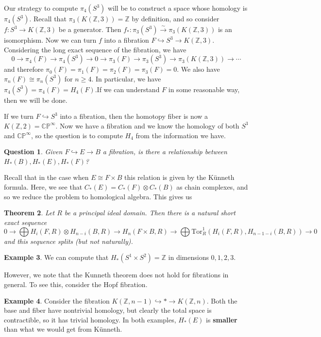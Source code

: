 \documentclass[leqno, openany]{memoir}
\newtheorem{thm}{Theorem}[section]
\newtheorem{quest}[thm]{Question}
\theoremstyle{definition}
\newtheorem{exm}[thm]{Example}
\theoremstyle{remark}
\theoremstyle{plain}
\theoremstyle{definition}
\theoremstyle{remark}
\newcommand{\C}{\mathbb{C}}
\newcommand{\Z}{\mathbb{Z}}
\renewcommand{\P}{\mathbb{P}}
\newcommand{\mr}[1]{\mathrm{#1}}
\begin{document}
Our strategy to compute $\pi_4(S^3)$ will be to construct a space whose homology is $\pi_4(S^3)$. Recall that $\pi_3(K(\Z, 3)) = \Z$ by definition, and so consider $f \colon S^3 \to K(\Z, 3)$ be a generator. Then $f_* \colon \pi_3(S^3) \xrightarrow{\sim} \pi_3(K(\Z, 3))$ is an isomorphism. Now we can turn $f$ into a fibration $F \hookrightarrow S^3 \to K(\Z, 3)$. Considering the long exact sequence of the fibration, we have
\[ 0 \to \pi_4(F) \to \pi_4(S^3) \to 0 \to \pi_3(F) \to \pi_3(S^3) \to \pi_3(K(\Z, 3)) \to \cdots \]
and therefore $\pi_0(F) = \pi_1(F) = \pi_2(F) = \pi_3(F) = 0$. We also have $\pi_n(F) \cong \pi_n(S^3)$ for $n \geq 4$. In particular, we have $\pi_4(S^3) = \pi_4(F) = H_4(F)$.If we can understand $F$ in some reasonable way, then we will be done.

If we turn $F \hookrightarrow S^3$ into a fibration, then the homotopy fiber is now a $K(\Z, 2) = \C\P^{\infty}$. Now we have a fibration and we know the homology of both $S^3$ and $\C\P^{\infty}$, so the question is to compute $H_4$ from the information we have.

\begin{quest}
    Given $F \hookrightarrow E \to B$ a fibration, is there a relationship between $H_*(B), H_*(E), H_*(F)$?
\end{quest}

Recall that in the case when $E \cong F \times B$ this relation is given by the K\"unneth formula. Here, we see that $C_*(E) = C_*(F) \otimes C_*(B)$ as chain complexes, and so we reduce the problem to homological algebra. This gives us

\begin{thm}
    Let $R$ be a principal ideal domain. Then there is a natural short exact sequence
    \[ 0 \to \bigoplus H_i(F,R) \otimes H_{n-i}(B, R) \to H_n(F \times B, R) \to \bigoplus \mr{Tor}^1_R(H_i(F,R), H_{n-1-i}(B, R)) \to 0 \]
    and this sequence splits (but not naturally).
\end{thm}

\begin{exm}
    We can compute that $H_*(S^1 \times S^2) = \Z$ in dimensions $0,1,2,3$.
\end{exm}

However, we note that the Kunneth theorem does not hold for fibrations in general. To see this, consider the Hopf fibration.

\begin{exm}
    Consider the fibration $K(\Z, n-1) \hookrightarrow * \to K(\Z, n)$. Both the base and fiber have nontrivial homology, but clearly the total space is contractible, so it has trivial homology. In both examples, $H_*(E)$ is \textbf{smaller} than what we would get from K\"unneth. 
\end{exm}
\end{document}
